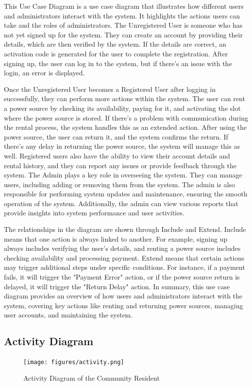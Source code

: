 { This Use Case Diagram is a use case diagram that illustrates how different users and administrators interact with the system. It highlights the actions users can take and the roles of administrators. The Unregistered User is someone who has not yet signed up for the system. They can create an account by providing their details, which are then verified by the system. If the details are correct, an activation code is generated for the user to complete the registration. After signing up, the user can log in to the system, but if there’s an issue with the login, an error is displayed.
 
 Once the Unregistered User becomes a Registered User after logging in successfully, they can perform more actions within the system. The user can rent a power source by checking its availability, paying for it, and activating the slot where the power source is stored. If there’s a problem with communication during the rental process, the system handles this as an extended action. After using the power source, the user can return it, and the system confirms the return. If there’s any delay in returning the power source, the system will manage this as well. Registered users also have the ability to view their account details and rental history, and they can report any issues or provide feedback through the system. The Admin plays a key role in overseeing the system. They can manage users, including adding or removing them from the system. The admin is also responsible for performing system updates and maintenance, ensuring the smooth operation of the system. Additionally, the admin can view various reports that provide insights into system performance and user activities.
 
 The relationships in the diagram are shown through Include and Extend. Include means that one action is always linked to another. For example, signing up always includes verifying the user's details, and renting a power source includes checking availability and processing payment. Extend means that certain actions may trigger additional steps under specific conditions. For instance, if a payment fails, it will trigger the "Payment Error" action, or if the power source return is delayed, it will trigger the "Return Delay" action. In summary, this use case diagram provides an overview of how users and administrators interact with the system, covering key actions like renting and returning power sources, managing user accounts, and maintaining the system.
 
 \subsection{Activity Diagram}
  \begin{figure}[H]
 	\centering
 	\caption{Activity Diagram of the Community Resident}
 	\label{fig:activity}
 	\texttt{[image: figures/activity.png]}
 \end{figure}
 
}
